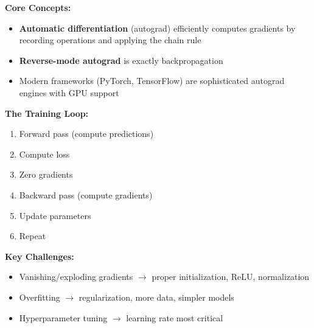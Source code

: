 \begin{summary}
\textbf{Core Concepts:}
\begin{itemize}
    \item \textbf{Automatic differentiation} (autograd) efficiently computes gradients by recording operations and applying the chain rule
    \item \textbf{Reverse-mode autograd} is exactly backpropagation
    \item Modern frameworks (PyTorch, TensorFlow) are sophisticated autograd engines with GPU support
\end{itemize}

\textbf{The Training Loop:}
\begin{enumerate}
    \item Forward pass (compute predictions)
    \item Compute loss
    \item Zero gradients
    \item Backward pass (compute gradients)
    \item Update parameters
    \item Repeat
\end{enumerate}

\textbf{Key Challenges:}
\begin{itemize}
    \item Vanishing/exploding gradients $\rightarrow$ proper initialization, ReLU, normalization
    \item Overfitting $\rightarrow$ regularization, more data, simpler models
    \item Hyperparameter tuning $\rightarrow$ learning rate most critical
\end{itemize}
\end{summary}
